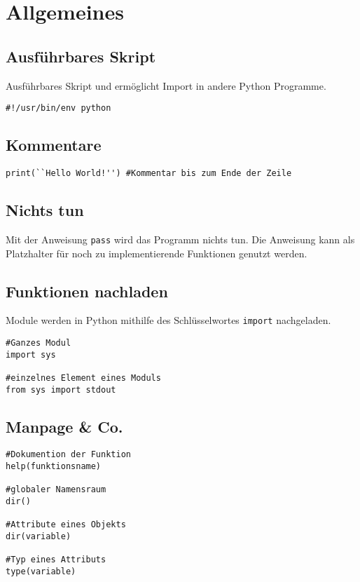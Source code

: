 \chapter{Allgemeines} 
\section{Ausführbares Skript}
Ausführbares Skript und ermöglicht Import in andere Python Programme.
\begin{lstlisting}
#!/usr/bin/env python
\end{lstlisting}
\section{Kommentare}
\begin{lstlisting}
print(``Hello World!'') #Kommentar bis zum Ende der Zeile
\end{lstlisting}
\section{Nichts tun}
Mit der Anweisung \texttt{pass} wird das Programm nichts tun. Die Anweisung kann als Platzhalter für noch zu implementierende Funktionen genutzt werden.
\section{Funktionen nachladen}
Module werden in Python mithilfe des Schlüsselwortes \texttt{import} nachgeladen.
\begin{lstlisting}
#Ganzes Modul
import sys

#einzelnes Element eines Moduls
from sys import stdout
\end{lstlisting}
\section{Manpage \& Co.}
\begin{lstlisting}
#Dokumention der Funktion
help(funktionsname)

#globaler Namensraum
dir()

#Attribute eines Objekts
dir(variable)

#Typ eines Attributs
type(variable)
\end{lstlisting}


